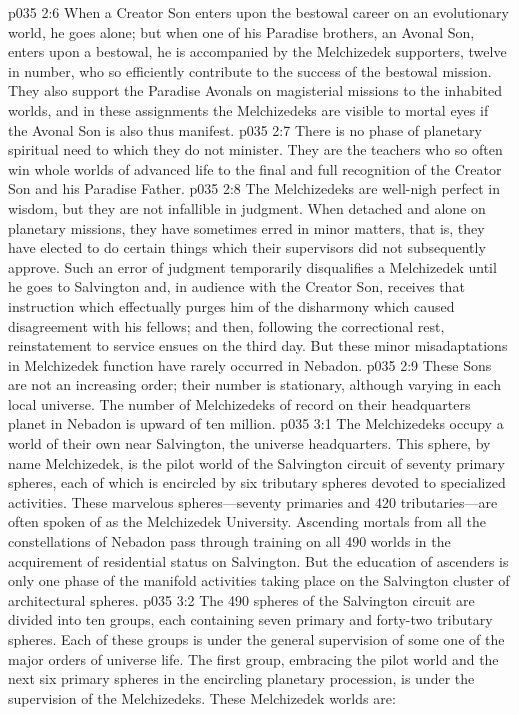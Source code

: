 \vs p035 2:6 When a Creator Son enters upon the bestowal career on an evolutionary world, he goes alone; but when one of his Paradise brothers, an Avonal Son, enters upon a bestowal, he is accompanied by the Melchizedek supporters, twelve in number, who so efficiently contribute to the success of the bestowal mission. They also support the Paradise Avonals on magisterial missions to the inhabited worlds, and in these assignments the Melchizedeks are visible to mortal eyes if the Avonal Son is also thus manifest.
\vs p035 2:7 There is no phase of planetary spiritual need to which they do not minister. They are the teachers who so often win whole worlds of advanced life to the final and full recognition of the Creator Son and his Paradise Father.
\pc \vs p035 2:8 The Melchizedeks are well\hyp{}nigh perfect in wisdom, but they are not infallible in judgment. When detached and alone on planetary missions, they have sometimes erred in minor matters, that is, they have elected to do certain things which their supervisors did not subsequently approve. Such an error of judgment temporarily disqualifies a Melchizedek until he goes to Salvington and, in audience with the Creator Son, receives that instruction which effectually purges him of the disharmony which caused disagreement with his fellows; and then, following the correctional rest, reinstatement to service ensues on the third day. But these minor misadaptations in Melchizedek function have rarely occurred in Nebadon.\plusone
\vs p035 2:9 These Sons are not an increasing order; their number is stationary, although varying in each local universe. The number of Melchizedeks of record on their headquarters planet in Nebadon is upward of ten million.
\vs p035 3:1 The Melchizedeks occupy a world of their own near Salvington, the universe headquarters. This sphere, by name Melchizedek, is the pilot world of the Salvington circuit of seventy primary spheres, each of which is encircled by six tributary spheres devoted to specialized activities. These marvelous spheres---seventy primaries and 420 tributaries---are often spoken of as the Melchizedek University. Ascending mortals from all the constellations of Nebadon pass through training on all 490 worlds in the acquirement of residential status on Salvington. But the education of ascenders is only one phase of the manifold activities taking place on the Salvington cluster of architectural spheres.
\vs p035 3:2 The 490 spheres of the Salvington circuit are divided into ten groups, each containing seven primary and forty\hyp{}two tributary spheres. Each of these groups is under the general supervision of some one of the major orders of universe life. The first group, embracing the pilot world and the next six primary spheres in the encircling planetary procession, is under the supervision of the Melchizedeks. These Melchizedek worlds are:
